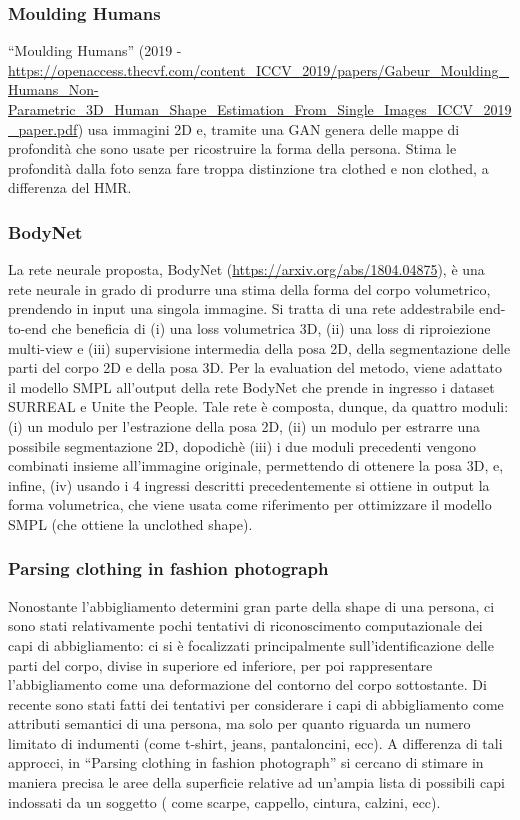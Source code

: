 \newpage

\subsubsection{Moulding Humans}

“Moulding Humans” (2019 - \url{https://openaccess.thecvf.com/content_ICCV_2019/papers/Gabeur_Moulding_Humans_Non-Parametric_3D_Human_Shape_Estimation_From_Single_Images_ICCV_2019_paper.pdf}) usa immagini 2D e, tramite una GAN genera delle mappe di profondità che sono usate per ricostruire la forma della persona.
Stima le profondità dalla foto senza fare troppa distinzione tra clothed e non clothed, a differenza del HMR.


\subsubsection{BodyNet}
La rete neurale proposta, BodyNet (\url{https://arxiv.org/abs/1804.04875}), è una rete neurale in grado di produrre una stima della forma del corpo volumetrico, prendendo in input una singola immagine. Si tratta di una rete addestrabile end-to-end che beneficia di (i) una loss volumetrica 3D, (ii) una loss di riproiezione multi-view e (iii) supervisione intermedia della posa 2D, della segmentazione delle parti del corpo 2D e della posa 3D. Per la evaluation del metodo, viene adattato il modello SMPL all’output della rete BodyNet che prende in ingresso i dataset SURREAL e Unite the People. Tale rete è composta, dunque, da quattro moduli: (i) un modulo per l’estrazione della posa 2D, (ii) un modulo per estrarre una possibile segmentazione 2D, dopodichè (iii) i due moduli precedenti vengono combinati insieme all'immagine originale, permettendo di ottenere la posa 3D, e, infine, (iv) usando i 4 ingressi descritti precedentemente si ottiene in output la forma volumetrica, che viene usata come riferimento per ottimizzare il modello SMPL (che ottiene la unclothed shape).

\subsubsection{Parsing clothing in fashion photograph}
Nonostante l’abbigliamento determini gran parte della shape di una persona, ci sono stati relativamente pochi tentativi di riconoscimento computazionale dei capi di abbigliamento: ci si è focalizzati principalmente sull’identificazione delle parti del corpo, divise in superiore ed inferiore, per poi rappresentare l’abbigliamento come una deformazione del contorno del corpo sottostante. Di recente sono stati fatti dei tentativi per considerare i capi di abbigliamento come attributi semantici di una persona, ma solo per quanto riguarda un numero limitato di indumenti (come t-shirt, jeans, pantaloncini, ecc).
A differenza di tali approcci, in “Parsing clothing in fashion photograph” si cercano di stimare in maniera precisa le aree della superficie relative ad un’ampia lista di possibili capi indossati da un soggetto ( come scarpe, cappello, cintura, calzini, ecc).

